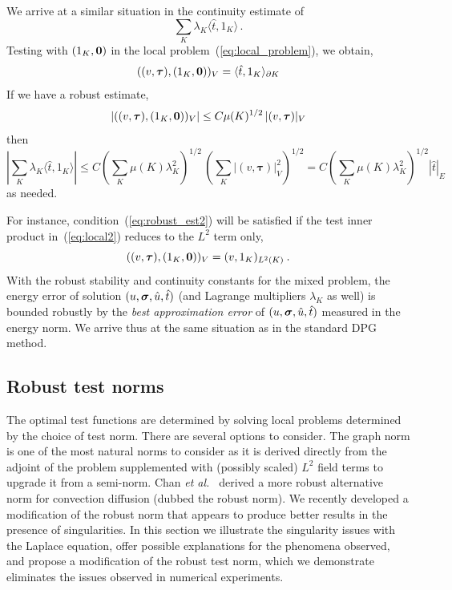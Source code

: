 \documentclass[letterpaper]{article}
\def\bftau{\boldsymbol\tau}
\newcommand{\ptl}{{\partial}}
\newcommand{\bfsig}{\mbox{\boldmath $\sigma$}}
\def\etal{{\it et al.~}}
\begin{document}
We arrive at a similar situation in the continuity estimate of
$$
\sum_K \lambda_K \langle \hat{t}, 1_K \rangle\,.
$$
Testing with $(1_K,{\bf 0})$ in the local problem~(\ref{eq:local_problem}), we obtain,
\begin{equation}
((v,\bftau),(1_K,{\bf 0}))_V = \langle \hat{t}, 1_K \rangle_{\ptl K}
\label{eq:local2}
\end{equation}
If we have a robust estimate,
\begin{equation}
| ((v,\bftau),(1_K,{\bf 0}))_V | \leq C \mu(K)^{1/2} \, | (v,\bftau) |_V
\label{eq:robust_est2}
\end{equation}
then
\begin{equation}
| \sum_K \lambda_K \langle \hat{t}, 1_K \rangle | \leq C (\sum_K \mu(K) \lambda_K^2)^{1/2}
\, (\sum_K | (v,\bftau) |_V^2)^{1/2}
= C (\sum_K \mu(K) \lambda_K^2)^{1/2}  | \hat{t} |_E
\end{equation}
as needed.

For instance, condition~(\ref{eq:robust_est2}) will be satisfied if the test inner product
in~(\ref{eq:local2}) reduces to the $L^2$ term only,
\begin{equation}
((v,\bftau),(1_K,{\bf 0}))_V = (v,1_K)_{L^2(K)} \: .
\end{equation}
With the robust stability and continuity constants for the mixed problem, the energy error
of solution $(u,\bfsig,\hat{u},\hat{t})$ (and Lagrange multipliers $\lambda_K$ as well)
is bounded robustly by the {\em best approximation error} of  $(u,\bfsig,\hat{u},\hat{t})$
measured in the energy norm. We arrive thus at the same situation as in the standard
DPG method.


\subsection{Robust test norms}
The optimal test functions are determined by solving local problems determined
by the choice of test norm. There are several options to consider.
The graph norm \cite{DPGOverview} is one of the most natural norms to consider
as it is derived directly from the adjoint of the problem supplemented with
(possibly scaled) $L^2$ field terms to upgrade it from a semi-norm.
Chan \etal\cite{ChanHeuerThanhDemkowicz2012} derived a more robust alternative
norm for convection diffusion (dubbed the robust norm). We recently
developed a modification of the robust norm that appears to produce better
results in the presence of singularities. In this section we illustrate the
singularity issues with the Laplace equation, offer possible explanations for
the phenomena observed, and propose a modification of the robust test norm,
which we demonstrate eliminates the issues observed in numerical experiments.
\end{document}
